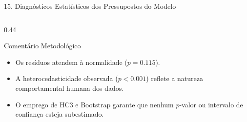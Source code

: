 \documentclass[aspectratio=169, 10pt]{beamer}
\begin{document}
\begin{frame}{15. Diagnósticos Estatísticos dos Pressupostos do Modelo}
\begin{columns}[T]
        \begin{column}{0.44\textwidth}
            \begin{exampleblock}{Comentário Metodológico}
                \begin{itemize}\small
                    \item Os resíduos atendem à normalidade ($p = 0.115$).
                    \item A heterocedasticidade observada ($p < 0.001$) reflete a natureza comportamental humana dos dados.
                    \item O emprego de HC3 e Bootstrap garante que nenhum $p$-valor ou intervalo de confiança esteja subestimado.
                \end{itemize}
            \end{exampleblock}
        \end{column}
    \end{columns}
\end{frame}
\end{document}
